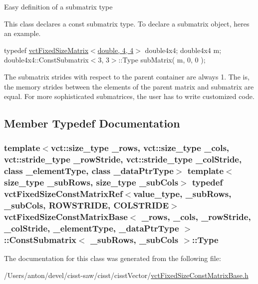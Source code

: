 Easy definition of a submatrix type

This class declares a const submatrix type. To declare a submatrix object, here\textquotesingle{}s an example.

typedef \hyperlink{classvct_fixed_size_matrix}{vct\+Fixed\+Size\+Matrix$<$double, 4, 4$>$} double4x4; double4x4 m; double4x4\+::\+Const\+Submatrix$<$3, 3$>$\+::\+Type sub\+Matrix( m, 0, 0 );

The submatrix strides with respect to the parent container are always 1. The is, the memory strides between the elements of the parent matrix and submatrix are equal. For more sophisticated submatrices, the user has to write customized code. 

\subsection{Member Typedef Documentation}
\hypertarget{classvct_fixed_size_const_matrix_base_1_1_const_submatrix_a274c4b7ec1c81155c412da08ab1e1f41}{}
\subsubsection[{Type}]{\setlength{\rightskip}{0pt plus 5cm}template$<$vct\+::size\+\_\+type \+\_\+rows, vct\+::size\+\_\+type \+\_\+cols, vct\+::stride\+\_\+type \+\_\+row\+Stride, vct\+::stride\+\_\+type \+\_\+col\+Stride, class \+\_\+element\+Type, class \+\_\+data\+Ptr\+Type$>$ template$<$size\+\_\+type \+\_\+sub\+Rows, size\+\_\+type \+\_\+sub\+Cols$>$ typedef {\bf vct\+Fixed\+Size\+Const\+Matrix\+Ref}$<$value\+\_\+type, \+\_\+sub\+Rows, \+\_\+sub\+Cols, {\bf R\+O\+W\+S\+T\+R\+I\+D\+E}, {\bf C\+O\+L\+S\+T\+R\+I\+D\+E}$>$ {\bf vct\+Fixed\+Size\+Const\+Matrix\+Base}$<$ \+\_\+rows, \+\_\+cols, \+\_\+row\+Stride, \+\_\+col\+Stride, \+\_\+element\+Type, \+\_\+data\+Ptr\+Type $>$\+::{\bf Const\+Submatrix}$<$ \+\_\+sub\+Rows, \+\_\+sub\+Cols $>$\+::{\bf Type}}\label{classvct_fixed_size_const_matrix_base_1_1_const_submatrix_a274c4b7ec1c81155c412da08ab1e1f41}


The documentation for this class was generated from the following file\+:\begin{DoxyCompactItemize}
\item 
/\+Users/anton/devel/cisst-\/saw/cisst/cisst\+Vector/\hyperlink{vct_fixed_size_const_matrix_base_8h}{vct\+Fixed\+Size\+Const\+Matrix\+Base.\+h}\end{DoxyCompactItemize}
